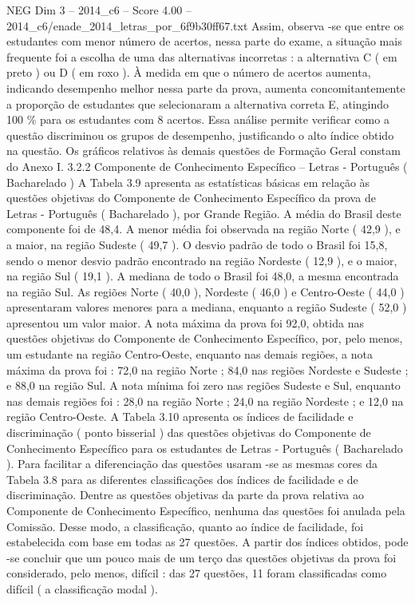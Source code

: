 \begin{textsample}{NEG Dim 3 – 2014\_c6 – Score 4.00 – 2014\_c6/enade\_2014\_letras\_por\_6f9b30ff67.txt}
Assim, observa -se que entre os estudantes com menor número de acertos, nessa parte do exame, a situação mais frequente foi a escolha de uma das alternativas incorretas : a alternativa C ( em preto ) ou D ( em roxo ).
À medida em que o número de acertos aumenta, indicando desempenho melhor nessa parte da prova, aumenta concomitantemente a proporção de estudantes que selecionaram a alternativa correta E, atingindo 100 \% para os estudantes com 8 acertos.
Essa análise permite verificar como a questão discriminou os grupos de desempenho, justificando o alto índice obtido na questão.
Os gráficos relativos às demais questões de Formação Geral constam do Anexo I. 3.2.2 Componente de Conhecimento Específico – Letras - Português ( Bacharelado ) A Tabela 3.9 apresenta as estatísticas básicas em relação às questões objetivas do Componente de Conhecimento Específico da prova de Letras - Português ( Bacharelado ), por Grande Região.
A média do Brasil deste componente foi de 48,4.
A menor média foi observada na região Norte ( 42,9 ), e a maior, na região Sudeste ( 49,7 ).
O desvio padrão de todo o Brasil foi 15,8, sendo o menor desvio padrão encontrado na região Nordeste ( 12,9 ), e o maior, na região Sul ( 19,1 ).
A mediana de todo o Brasil foi 48,0, a mesma encontrada na região Sul.
As regiões Norte ( 40,0 ), Nordeste ( 46,0 ) e Centro-Oeste ( 44,0 ) apresentaram valores menores para a mediana, enquanto a região Sudeste ( 52,0 ) apresentou um valor maior.
A nota máxima da prova foi 92,0, obtida nas questões objetivas do Componente de Conhecimento Específico, por, pelo menos, um estudante na região Centro-Oeste, enquanto nas demais regiões, a nota máxima da prova foi : 72,0 na região Norte ; 84,0 nas regiões Nordeste e Sudeste ; e 88,0 na região Sul.
A nota mínima foi zero nas regiões Sudeste e Sul, enquanto nas demais regiões foi : 28,0 na região Norte ; 24,0 na região Nordeste ; e 12,0 na região Centro-Oeste.
A Tabela 3.10 apresenta os índices de facilidade e discriminação ( ponto bisserial ) das questões objetivas do Componente de Conhecimento Específico para os estudantes de Letras - Português ( Bacharelado ).
Para facilitar a diferenciação das questões usaram -se as mesmas cores da Tabela 3.8 para as diferentes classificações dos índices de facilidade e de discriminação.
Dentre as questões objetivas da parte da prova relativa ao Componente de Conhecimento Específico, nenhuma das questões foi anulada pela Comissão.
Desse modo, a classificação, quanto ao índice de facilidade, foi estabelecida com base em todas as 27 questões.
A partir dos índices obtidos, pode -se concluir que um pouco mais de um terço das questões objetivas da prova foi considerado, pelo menos, difícil : das 27 questões, 11 foram classificadas como difícil ( a classificação modal ).

\end{textsample}
